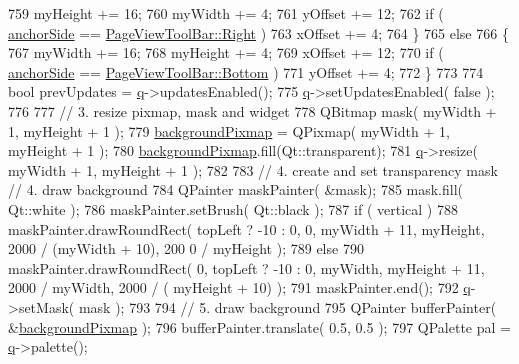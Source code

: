 \begin{DoxyCode}
759         myHeight += 16;
760         myWidth += 4;
761         yOffset += 12;
762         \textcolor{keywordflow}{if} ( \hyperlink{classToolBarPrivate_ab776848ec81463b3008086418bc55161}{anchorSide} == \hyperlink{classPageViewToolBar_a6410ac0bc9e35fba1314cfd6d7049385a67d6065aeb6f242a23f9b9ae2426b136}{PageViewToolBar::Right} )
763             xOffset += 4;
764     \}
765     \textcolor{keywordflow}{else}
766     \{
767         myWidth += 16;
768         myHeight += 4;
769         xOffset += 12;
770         \textcolor{keywordflow}{if} ( \hyperlink{classToolBarPrivate_ab776848ec81463b3008086418bc55161}{anchorSide} == \hyperlink{classPageViewToolBar_a6410ac0bc9e35fba1314cfd6d7049385ab20155b7a2791a54d63c84d188b67a43}{PageViewToolBar::Bottom} )
771             yOffset += 4;
772     \}
773 
774     \textcolor{keywordtype}{bool} prevUpdates = \hyperlink{classToolBarPrivate_a05b6db3d3667cbc748dd957a800eec07}{q}->updatesEnabled();
775     \hyperlink{classToolBarPrivate_a05b6db3d3667cbc748dd957a800eec07}{q}->setUpdatesEnabled( \textcolor{keyword}{false} );
776 
777     \textcolor{comment}{// 3. resize pixmap, mask and widget}
778     QBitmap mask( myWidth + 1, myHeight + 1 );
779     \hyperlink{classToolBarPrivate_a5f5e42e6d6aebc59080c0f551728cc0b}{backgroundPixmap} = QPixmap( myWidth + 1, myHeight + 1 );
780     \hyperlink{classToolBarPrivate_a5f5e42e6d6aebc59080c0f551728cc0b}{backgroundPixmap}.fill(Qt::transparent);
781     \hyperlink{classToolBarPrivate_a05b6db3d3667cbc748dd957a800eec07}{q}->resize( myWidth + 1, myHeight + 1 );
782 
783     \textcolor{comment}{// 4. create and set transparency mask          // 4. draw background}
784     QPainter maskPainter( &mask);
785     mask.fill( Qt::white );     
786     maskPainter.setBrush( Qt::black );          
787     \textcolor{keywordflow}{if} ( vertical )     
788         maskPainter.drawRoundRect( topLeft ? -10 : 0, 0, myWidth + 11, myHeight, 2000 / (myWidth + 10), 200
      0 / myHeight );      
789     \textcolor{keywordflow}{else}        
790         maskPainter.drawRoundRect( 0, topLeft ? -10 : 0, myWidth, myHeight + 11, 2000 / myWidth, 2000 / (
      myHeight + 10) );      
791     maskPainter.end();          
792     \hyperlink{classToolBarPrivate_a05b6db3d3667cbc748dd957a800eec07}{q}->setMask( mask );
793 
794     \textcolor{comment}{// 5. draw background}
795     QPainter bufferPainter( &\hyperlink{classToolBarPrivate_a5f5e42e6d6aebc59080c0f551728cc0b}{backgroundPixmap} );
796     bufferPainter.translate( 0.5, 0.5 );
797     QPalette pal = \hyperlink{classToolBarPrivate_a05b6db3d3667cbc748dd957a800eec07}{q}->palette();

\end{DoxyCode}
